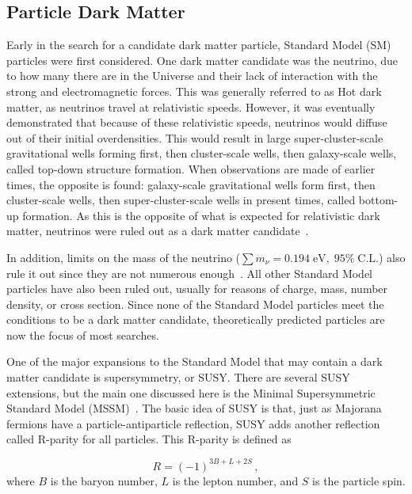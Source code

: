 \subsection{Particle Dark Matter}\label{sec_particledm}

Early in the search for a candidate dark matter particle, Standard Model (SM) particles were first considered.
One dark matter candidate was the neutrino, due to how many there are in the Universe and their lack of interaction with the strong and electromagnetic forces.
This was generally referred to as Hot dark matter, as neutrinos travel at relativistic speeds.
However, it was eventually demonstrated that because of these relativistic speeds, neutrinos would diffuse out of their initial overdensities.
This would result in large super-cluster-scale gravitational wells forming first, then cluster-scale wells, then galaxy-scale wells, called top-down structure formation.
When observations are made of earlier times, the opposite is found: galaxy-scale gravitational wells form first, then cluster-scale wells, then super-cluster-scale wells in present times, called bottom-up formation.
As this is the opposite of what is expected for relativistic dark matter, neutrinos were ruled out as a dark matter candidate~\cite{neutrinoHeirarchical}.

In addition, limits on the mass of the neutrino ($\sum{}m_{\nu} = 0.194 \; \textrm{eV}, \; 95\% \; \textrm{C.L.}$) also rule it out since they are not numerous enough~\cite{planck2015}.
All other Standard Model particles have also been ruled out, usually for reasons of charge, mass, number density, or cross section.
Since none of the Standard Model particles meet the conditions to be a dark matter candidate, theoretically predicted particles are now the focus of most searches.

One of the major expansions to the Standard Model that may contain a dark matter candidate is supersymmetry, or SUSY.
There are several SUSY extensions, but the main one discussed here is the Minimal Supersymmetric Standard Model (MSSM)~\cite{MSSM,supersym1,schelke_thesis}.
The basic idea of SUSY is that, just as Majorana fermions have a particle-antiparticle reflection, SUSY adds another reflection called R-parity for all particles. 
This R-parity is defined as

\begin{equation}
  R = (-1)^{3B+L+2S} \,,
\end{equation}
where $B$ is the baryon number, $L$ is the lepton number, and $S$ is the particle spin.

